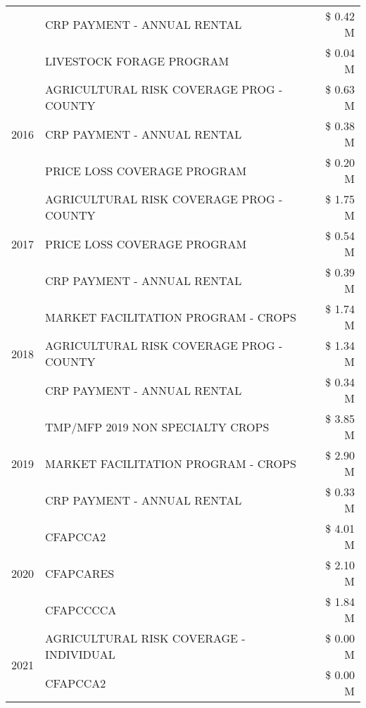 \begin{tabular}{llr}
 & CRP PAYMENT - ANNUAL RENTAL & \$ 0.42 M \\
 & LIVESTOCK FORAGE PROGRAM & \$ 0.04 M \\
\cline{1-3}
\multirow[t]{3}{*}{2016} & AGRICULTURAL RISK COVERAGE PROG - COUNTY & \$ 0.63 M \\
 & CRP PAYMENT - ANNUAL RENTAL & \$ 0.38 M \\
 & PRICE LOSS COVERAGE PROGRAM & \$ 0.20 M \\
\cline{1-3}
\multirow[t]{3}{*}{2017} & AGRICULTURAL RISK COVERAGE PROG - COUNTY & \$ 1.75 M \\
 & PRICE LOSS COVERAGE PROGRAM & \$ 0.54 M \\
 & CRP PAYMENT - ANNUAL RENTAL & \$ 0.39 M \\
\cline{1-3}
\multirow[t]{3}{*}{2018} & MARKET FACILITATION PROGRAM - CROPS & \$ 1.74 M \\
 & AGRICULTURAL RISK COVERAGE PROG - COUNTY & \$ 1.34 M \\
 & CRP PAYMENT - ANNUAL RENTAL & \$ 0.34 M \\
\cline{1-3}
\multirow[t]{3}{*}{2019} & TMP/MFP 2019 NON SPECIALTY CROPS & \$ 3.85 M \\
 & MARKET FACILITATION PROGRAM - CROPS & \$ 2.90 M \\
 & CRP PAYMENT - ANNUAL RENTAL & \$ 0.33 M \\
\cline{1-3}
\multirow[t]{3}{*}{2020} & CFAPCCA2 & \$ 4.01 M \\
 & CFAPCARES & \$ 2.10 M \\
 & CFAPCCCCA & \$ 1.84 M \\
\cline{1-3}
\multirow[t]{2}{*}{2021} & AGRICULTURAL RISK COVERAGE - INDIVIDUAL & \$ 0.00 M \\
 & CFAPCCA2 & \$ 0.00 M \\
\cline{1-3}
\bottomrule
\end{tabular}
